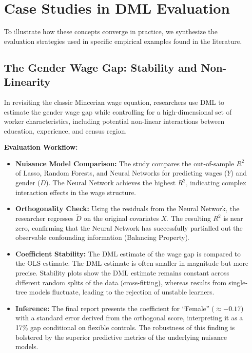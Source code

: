 \documentclass[12pt,a4paper]{article}
\begin{document}
\section{Case Studies in DML Evaluation}

To illustrate how these concepts converge in practice, we synthesize the evaluation strategies used in specific empirical examples found in the literature.

\subsection{The Gender Wage Gap: Stability and Non-Linearity}

In revisiting the classic Mincerian wage equation, researchers use DML to estimate the gender wage gap while controlling for a high-dimensional set of worker characteristics, including potential non-linear interactions between education, experience, and census region.

\textbf{Evaluation Workflow:}
\begin{itemize}
\item \textbf{Nuisance Model Comparison:} The study compares the out-of-sample $R^2$ of Lasso, Random Forests, and Neural Networks for predicting wages ($Y$) and gender ($D$). The Neural Network achieves the highest $R^2$, indicating complex interaction effects in the wage structure.
\item \textbf{Orthogonality Check:} Using the residuals from the Neural Network, the researcher regresses $\tilde{D}$ on the original covariates $X$. The resulting $R^2$ is near zero, confirming that the Neural Network has successfully partialled out the observable confounding information (Balancing Property).
\item \textbf{Coefficient Stability:} The DML estimate of the wage gap is compared to the OLS estimate. The DML estimate is often smaller in magnitude but more precise. Stability plots show the DML estimate remains constant across different random splits of the data (cross-fitting), whereas results from single-tree models fluctuate, leading to the rejection of unstable learners.
\item \textbf{Inference:} The final report presents the coefficient for ``Female'' ($\approx -0.17$) with a standard error derived from the orthogonal score, interpreting it as a 17\% gap conditional on flexible controls. The robustness of this finding is bolstered by the superior predictive metrics of the underlying nuisance models.
\end{itemize}
\end{document}
